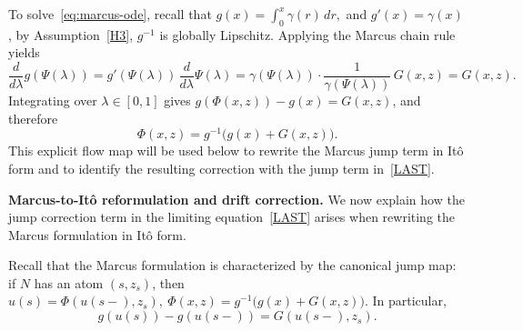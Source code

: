 \documentclass[11pt]{article}
\theoremstyle{plain}
\numberwithin{equation}{section}
\begin{document}
To solve~\eqref{eq:marcus-ode}, recall that \(g(x)=\int_0^x \gamma(r)\,dr,\) and  $g'(x)=\gamma(x)$, by Assumption~\ref{H3}, $g^{-1}$ is globally
Lipschitz. Applying the Marcus chain rule yields
\[
\frac{d}{d\lambda} g(\Psi(\lambda))
= g'(\Psi(\lambda))\,\frac{d}{d\lambda}\Psi(\lambda)
= \gamma(\Psi(\lambda))\cdot \frac{1}{\gamma(\Psi(\lambda))}\,G(x,z)
= G(x,z).
\]
Integrating over $\lambda\in[0,1]$ gives $g(\Phi(x,z))-g(x)=G(x,z)$, and therefore
\begin{equation}\label{eq:marcus-flow-explicit}
\Phi(x,z)=g^{-1}\big(g(x)+G(x,z)\big).
\end{equation}
This explicit flow map will be used below to rewrite the Marcus jump term in It\^o form
and to identify the resulting correction with the jump term in~\eqref{LAST}.

\medskip
\noindent\textbf{Marcus-to-It\^o reformulation and drift correction.}
We now explain how the jump correction term in the limiting equation~\eqref{LAST}
arises when rewriting the Marcus formulation in It\^o form.

\smallskip
Recall that the Marcus formulation is characterized by the canonical jump map:
if $N$ has an atom $(s,z_s)$, then \(u(s)=\Phi(u(s-),z_s),~\Phi(x,z)=g^{-1}\big(g(x)+G(x,z)\big).\)
In particular,
\begin{equation}\label{eq:g-jump}
g(u(s))-g(u(s-))=G(u(s-),z_s).
\end{equation}
\end{document}
